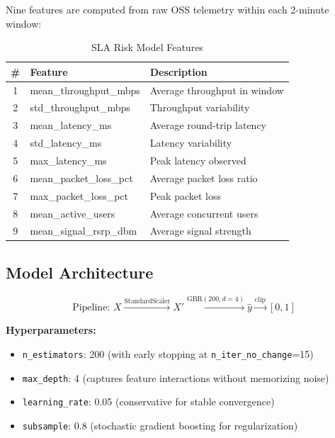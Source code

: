 Nine features are computed from raw OSS telemetry within each 2-minute window:

\begin{table}[H]
\centering
\caption{SLA Risk Model Features}
\label{tab:sla-features}
\begin{tabular}{@{}cll@{}}
\toprule
\textbf{\#} & \textbf{Feature} & \textbf{Description} \\
\midrule
1 & mean\_throughput\_mbps & Average throughput in window \\
2 & std\_throughput\_mbps & Throughput variability \\
3 & mean\_latency\_ms & Average round-trip latency \\
4 & std\_latency\_ms & Latency variability \\
5 & max\_latency\_ms & Peak latency observed \\
6 & mean\_packet\_loss\_pct & Average packet loss ratio \\
7 & max\_packet\_loss\_pct & Peak packet loss \\
8 & mean\_active\_users & Average concurrent users \\
9 & mean\_signal\_rsrp\_dbm & Average signal strength \\
\bottomrule
\end{tabular}
\end{table}

\subsection{Model Architecture}

\begin{equation}
\text{Pipeline: } X \xrightarrow{\text{StandardScaler}} X' \xrightarrow{\text{GBR}(200, d{=}4)} \hat{y} \xrightarrow{\text{clip}} [0, 1]
\end{equation}

\textbf{Hyperparameters:}
\begin{itemize}
    \item \texttt{n\_estimators}: 200 (with early stopping at \texttt{n\_iter\_no\_change}=15)
    \item \texttt{max\_depth}: 4 (captures feature interactions without memorizing noise)
    \item \texttt{learning\_rate}: 0.05 (conservative for stable convergence)
    \item \texttt{subsample}: 0.8 (stochastic gradient boosting for regularization)
\end{itemize}

